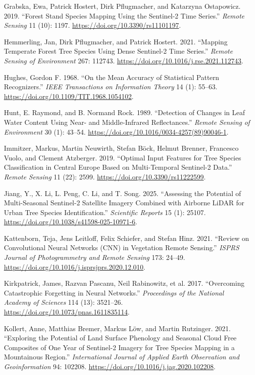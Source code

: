 \documentclass[11pt,a4paper]{scrartcl}
\begin{document}
\begin{CSLReferences}{1}{1}
Grabska, Ewa, Patrick Hostert, Dirk Pflugmacher, and Katarzyna
Ostapowicz. 2019. {``Forest Stand Species Mapping Using the Sentinel-2
Time Series.''} \emph{Remote Sensing} 11 (10): 1197.
\url{https://doi.org/10.3390/rs11101197}.

Hemmerling, Jan, Dirk Pflugmacher, and Patrick Hostert. 2021. {``Mapping
Temperate Forest Tree Species Using Dense Sentinel-2 Time Series.''}
\emph{Remote Sensing of Environment} 267: 112743.
\url{https://doi.org/10.1016/j.rse.2021.112743}.

Hughes, Gordon F. 1968. {``On the Mean Accuracy of Statistical Pattern
Recognizers.''} \emph{IEEE Transactions on Information Theory} 14 (1):
55--63. \url{https://doi.org/10.1109/TIT.1968.1054102}.

Hunt, E. Raymond, and B. Normand Rock. 1989. {``Detection of Changes in
Leaf Water Content Using Near- and Middle-Infrared Reflectances.''}
\emph{Remote Sensing of Environment} 30 (1): 43--54.
\url{https://doi.org/10.1016/0034-4257(89)90046-1}.

Immitzer, Markus, Martin Neuwirth, Stefan Böck, Helmut Brenner,
Francesco Vuolo, and Clement Atzberger. 2019. {``Optimal Input Features
for Tree Species Classification in Central Europe Based on
Multi-Temporal Sentinel-2 Data.''} \emph{Remote Sensing} 11 (22): 2599.
\url{https://doi.org/10.3390/rs11222599}.

Jiang, Y., X. Li, L. Peng, C. Li, and T. Song. 2025. {``Assessing the
Potential of Multi-Seasonal Sentinel-2 Satellite Imagery Combined with
Airborne LiDAR for Urban Tree Species Identification.''}
\emph{Scientific Reports} 15 (1): 25107.
\url{https://doi.org/10.1038/s41598-025-10971-6}.

Kattenborn, Teja, Jens Leitloff, Felix Schiefer, and Stefan Hinz. 2021.
{``Review on Convolutional Neural Networks (CNN) in Vegetation Remote
Sensing.''} \emph{ISPRS Journal of Photogrammetry and Remote Sensing}
173: 24--49. \url{https://doi.org/10.1016/j.isprsjprs.2020.12.010}.

Kirkpatrick, James, Razvan Pascanu, Neil Rabinowitz, et al. 2017.
{``Overcoming Catastrophic Forgetting in Neural Networks.''}
\emph{Proceedings of the National Academy of Sciences} 114 (13):
3521--26. \url{https://doi.org/10.1073/pnas.1611835114}.

Kollert, Anne, Matthias Bremer, Markus Löw, and Martin Rutzinger. 2021.
{``Exploring the Potential of Land Surface Phenology and Seasonal Cloud
Free Composites of One Year of Sentinel-2 Imagery for Tree Species
Mapping in a Mountainous Region.''} \emph{International Journal of
Applied Earth Observation and Geoinformation} 94: 102208.
\url{https://doi.org/10.1016/j.jag.2020.102208}.


\end{CSLReferences}
\end{document}
